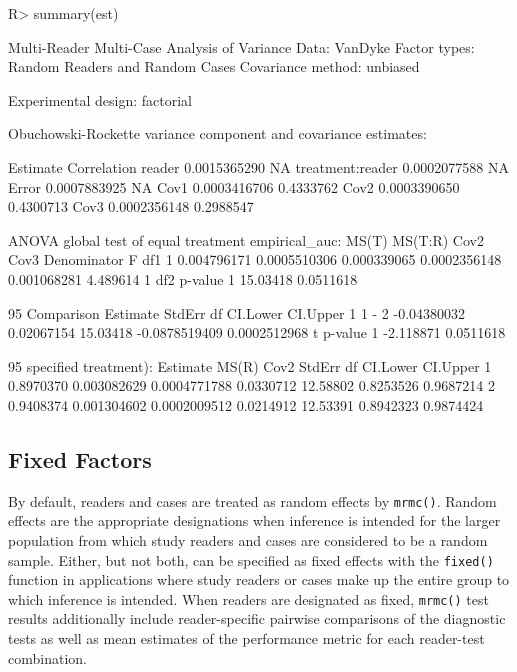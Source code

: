 \documentclass[
]{jss}
\begin{document}
\begin{CodeChunk}
\begin{CodeInput}
R> summary(est)
\end{CodeInput}
\begin{CodeOutput}
Multi-Reader Multi-Case Analysis of Variance
Data: VanDyke
Factor types: Random Readers and Random Cases
Covariance method: unbiased

Experimental design: factorial 

Obuchowski-Rockette variance component and covariance estimates:

                     Estimate Correlation
reader           0.0015365290          NA
treatment:reader 0.0002077588          NA
Error            0.0007883925          NA
Cov1             0.0003416706   0.4333762
Cov2             0.0003390650   0.4300713
Cov3             0.0002356148   0.2988547


ANOVA global test of equal treatment empirical_auc:
        MS(T)      MS(T:R)        Cov2         Cov3 Denominator        F df1
1 0.004796171 0.0005510306 0.000339065 0.0002356148 0.001068281 4.489614   1
       df2   p-value
1 15.03418 0.0511618


95%
  Comparison    Estimate     StdErr       df      CI.Lower      CI.Upper
1      1 - 2 -0.04380032 0.02067154 15.03418 -0.0878519409  0.0002512968
          t   p-value
1 -2.118871 0.0511618


95%
specified treatment):
   Estimate       MS(R)         Cov2    StdErr       df  CI.Lower  CI.Upper
1 0.8970370 0.003082629 0.0004771788 0.0330712 12.58802 0.8253526 0.9687214
2 0.9408374 0.001304602 0.0002009512 0.0214912 12.53391 0.8942323 0.9874424
\end{CodeOutput}
\end{CodeChunk}

\hypertarget{fixed-factors}{%
\subsection{Fixed Factors}\label{fixed-factors}}

By default, readers and cases are treated as random effects by
\texttt{mrmc()}. Random effects are the appropriate designations when
inference is intended for the larger population from which study readers
and cases are considered to be a random sample. Either, but not both,
can be specified as fixed effects with the \texttt{fixed()} function in
applications where study readers or cases make up the entire group to
which inference is intended. When readers are designated as fixed,
\texttt{mrmc()} test results additionally include reader-specific
pairwise comparisons of the diagnostic tests as well as mean estimates
of the performance metric for each reader-test combination.
\end{document}
